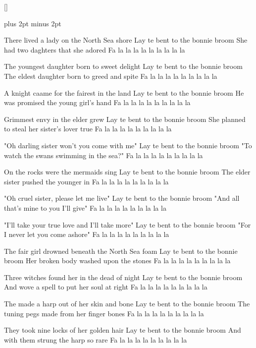 \begin{intersong*}
\end{intersong*}
[]

\versesep=12pt plus 2pt minus 2pt

\beginverse\memorize
There lived a lady on the North Sea shore
Lay te bent to the bonnie broom
She had two daghters that she adored
Fa la la la la la la la la la
\endverse

\beginverse
The youngest daughter born to sweet delight
Lay te bent to the bonnie broom
The eldest daughter born to greed and spite
Fa la la la la la la la la la
\endverse

\beginverse
A knight caame for the fairest in the land
Lay te bent to the bonnie broom
He was promised the young girl's hand
Fa la la la la la la la la la
\endverse

\beginverse
Grimmest envy in the elder grew
Lay te bent to the bonnie broom
She planned to steal her sister's lover true
Fa la la la la la la la la la
\endverse

\beginverse
"Oh darling sister won't you come with me"
Lay te bent to the bonnie broom
"To watch the swans swimming in the sea?"
Fa la la la la la la la la la
\endverse

\beginverse
On the rocks were the mermaids sing
Lay te bent to the bonnie broom
The elder sister pushed the younger in
Fa la la la la la la la la la
\endverse

\beginverse
"Oh cruel sister, please let me live"
Lay te bent to the bonnie broom
"And all that's mine to you I'll give"
Fa la la la la la la la la la
\endverse

\beginverse
"I'll take your true love and I'll take more"
Lay te bent to the bonnie broom
"For I never let you come ashore"
Fa la la la la la la la la la
\endverse

\beginverse
The fair girl drowned beneath the North Sea foam
Lay te bent to the bonnie broom
Her broken body washed upon the stones
Fa la la la la la la la la la
\endverse

\beginverse
Three witches found her in the dead of night
Lay te bent to the bonnie broom
And wove a spell to put her soul at right
Fa la la la la la la la la la
\endverse

\beginverse
The made a harp out of her skin and bone
Lay te bent to the bonnie broom
The tuning pegs made from her finger bones
Fa la la la la la la la la la
\endverse

\beginverse
They took nine locks of her golden hair
Lay te bent to the bonnie broom
And with them strung the harp so rare
Fa la la la la la la la la la
\endverse

